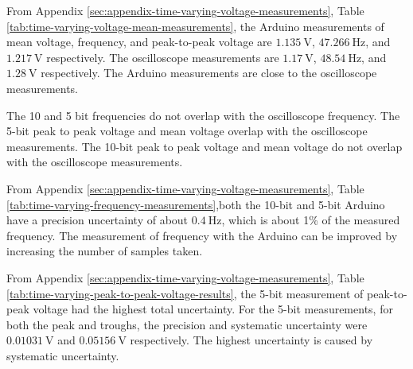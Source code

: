 From Appendix \ref{sec:appendix-time-varying-voltage-measurements}, Table \ref{tab:time-varying-voltage-mean-measurements},
the Arduino measurements of mean voltage, frequency, and peak-to-peak voltage are $\qty{1.135}{\volt}$, $\qty{47.266}{\hertz}$, and $\qty{1.217}{\volt}$ respectively.
The oscilloscope measurements are $\qty{1.17}{\volt}$, $\qty{48.54}{\hertz}$, and $\qty{1.28}{\volt}$ respectively. The Arduino measurements are close 
to the oscilloscope measurements. 

The 10 and 5 bit frequencies do not overlap with the oscilloscope frequency. The 5-bit peak to peak voltage and mean voltage overlap with the oscilloscope measurements.
The 10-bit peak to peak voltage and mean voltage do not overlap with the oscilloscope measurements.

From Appendix \ref{sec:appendix-time-varying-voltage-measurements}, Table \ref{tab:time-varying-frequency-measurements},both the 10-bit 
and 5-bit Arduino have a precision uncertainty of about $\qty{0.4}{\hertz}$, which is about 1\% of the measured frequency. 
The measurement of frequency with the Arduino can be improved by increasing the number of samples taken.

From Appendix \ref{sec:appendix-time-varying-voltage-measurements}, Table \ref{tab:time-varying-peak-to-peak-voltage-results}, 
the 5-bit measurement of peak-to-peak voltage had the highest total uncertainty. For the 5-bit measurements, for both the peak and troughs, 
the precision and systematic uncertainty were $\qty{0.01031}{\volt}$ and $\qty{0.05156}{\volt}$ respectively. The highest uncertainty is caused by 
systematic uncertainty.

